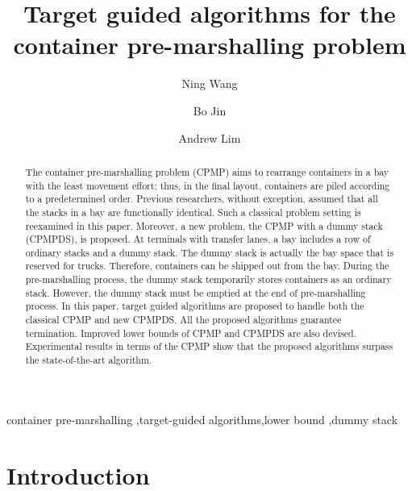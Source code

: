 \documentclass[review,3p,times,authoryear,12pt]{elsarticle}
\begin{document}
\graphicspath{{./figure/}}
\begin{frontmatter}
\newpage

\title{Target guided algorithms for the container pre-marshalling problem}

\author{Ning Wang}

\author{Bo Jin}

\author{Andrew Lim}

\address{
Department of Management Sciences, City University of Hong Kong, 83 Tat Chee Ave, Kowloon Tong, Hong Kong
}

\begin{abstract}
The container pre-marshalling problem (CPMP) aims to rearrange containers in a bay with the least movement effort; thus, in the final layout, containers are piled according to a predetermined order.
Previous researchers, without exception, assumed that all the stacks in a bay are functionally identical.
Such a classical problem setting is reexamined in this paper.
Moreover, a new problem, the CPMP with a dummy stack (CPMPDS), is proposed.
At terminals with transfer lanes, a bay includes a row of ordinary stacks and a dummy stack.
The dummy stack is actually the bay space that is reserved for trucks.
Therefore, containers can be shipped out from the bay.
During the pre-marshalling process, the dummy stack temporarily stores containers as an ordinary stack.
However, the dummy stack must be emptied at the end of pre-marshalling process.
In this paper, target guided algorithms are proposed to handle both the classical CPMP and new CPMPDS.
All the proposed algorithms guarantee termination.
Improved lower bounds of CPMP and CPMPDS are also devised.
Experimental results in terms of the CPMP show that the proposed algorithms surpass the state-of-the-art algorithm.
\end{abstract}

\begin{keyword}
container pre-marshalling \sep target-guided algorithms\sep lower bound \sep dummy stack
\end{keyword}
\end{frontmatter}

\section{Introduction}
\end{document}
